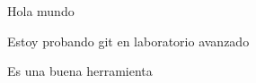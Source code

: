 \documentclass{article}
\begin{document}
Hola mundo

Estoy probando git en laboratorio avanzado 

Es una buena herramienta 
\end{document}
